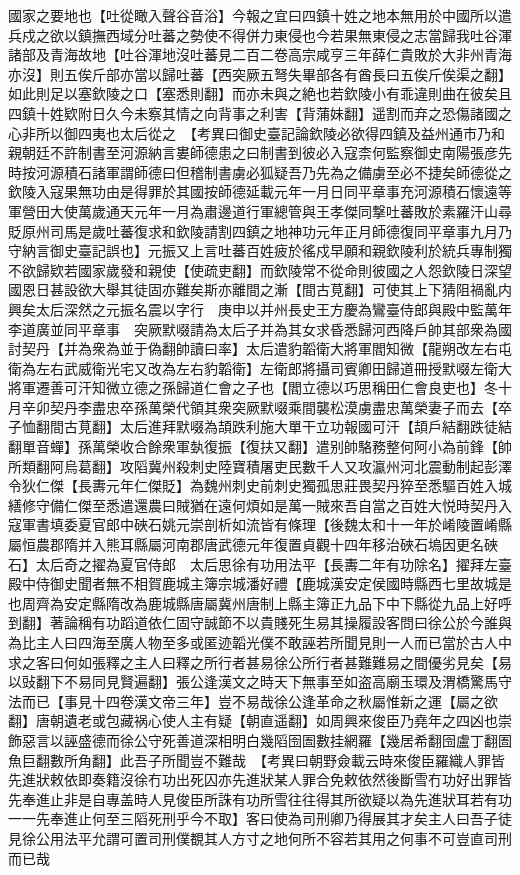 國家之要地也【吐從瞰入聲谷音浴】今報之宜曰四鎮十姓之地本無用於中國所以遣兵戍之欲以鎮撫西域分吐蕃之勢使不得併力東侵也今若果無東侵之志當歸我吐谷渾諸部及青海故地【吐谷渾地沒吐蕃見二百二卷高宗咸亨三年薛仁貴敗於大非州青海亦沒】則五俟斤部亦當以歸吐蕃【西突厥五弩失畢部各有酋長曰五俟斤俟渠之翻】如此則足以塞欽陵之口【塞悉則翻】而亦未與之絶也若欽陵小有乖違則曲在彼矣且四鎮十姓欵附日久今未察其情之向背事之利害【背蒲妹翻】遥割而弃之恐傷諸國之心非所以御四夷也太后從之　【考異曰御史臺記論欽陵必欲得四鎮及益州通市乃和親朝廷不許制書至河源納言婁師德患之曰制書到彼必入寇柰何監察御史南陽張彦先時按河源積石諸軍謂師德曰但稽制書虜必狐疑吾乃先為之備虜至必不捷矣師德從之欽陵入寇果無功由是得罪於其國按師德延載元年一月日同平章事充河源積石懷遠等軍營田大使萬歲通天元年一月為肅邊道行軍總管與王孝傑同撃吐蕃敗於素羅汗山尋貶原州司馬是歲吐蕃復求和欽陵請割四鎮之地神功元年正月師德復同平章事九月乃守納言御史臺記誤也】元振又上言吐蕃百姓疲於徭戍早願和親欽陵利於統兵專制獨不欲歸欵若國家歲發和親使【使疏吏翻】而欽陵常不從命則彼國之人怨欽陵日深望國恩日甚設欲大舉其徒固亦難矣斯亦離間之漸【間古莧翻】可使其上下猜阻禍亂内興矣太后深然之元振名震以字行　庚申以并州長史王方慶為鸞臺侍郎與殿中監萬年李道廣並同平章事　突厥默啜請為太后子并為其女求昏悉歸河西降戶帥其部衆為國討契丹【并為衆為並于偽翻帥讀曰率】太后遣豹韜衛大將軍閻知微【龍朔改左右屯衛為左右武威衛光宅又改為左右豹韜衛】左衛郎將攝司賓卿田歸道冊授默啜左衛大將軍遷善可汗知微立德之孫歸道仁會之子也【閻立德以巧思稱田仁會良吏也】冬十月辛卯契丹李盡忠卒孫萬榮代領其衆突厥默啜乘間襲松漠虜盡忠萬榮妻子而去【卒子恤翻間古莧翻】太后進拜默啜為頡跌利施大單干立功報國可汗【頡戶結翻跌徒結翻單音蟬】孫萬榮收合餘衆軍埶復振【復扶又翻】遣别帥駱務整何阿小為前鋒【帥所類翻阿烏葛翻】攻䧟冀州殺刺史陸寶積屠吏民數千人又攻瀛州河北震動制起彭澤令狄仁傑【長夀元年仁傑貶】為魏州刺史前刺史獨孤思莊畏契丹猝至悉驅百姓入城繕修守備仁傑至悉遣還農曰賊猶在遠何煩如是萬一賊來吾自當之百姓大悦時契丹入寇軍書填委夏官郎中硤石姚元崇剖析如流皆有條理【後魏太和十一年於崤陵置崤縣屬恒農郡隋并入熊耳縣屬河南郡唐武德元年復置貞觀十四年移治硤石塢因更名硤石】太后奇之擢為夏官侍郎　太后思徐有功用法平【長夀二年有功除名】擢拜左臺殿中侍御史聞者無不相賀鹿城主簿宗城潘好禮【鹿城漢安定侯國時縣西七里故城是也周齊為安定縣隋改為鹿城縣唐屬冀州唐制上縣主簿正九品下中下縣從九品上好呼到翻】著論稱有功蹈道依仁固守誠節不以貴賤死生易其操履設客問曰徐公於今誰與為比主人曰四海至廣人物至多或匿迹韜光僕不敢誣若所聞見則一人而已當於古人中求之客曰何如張釋之主人曰釋之所行者甚易徐公所行者甚難難易之間優劣見矣【易以䜴翻下不易同見賢遍翻】張公逢漢文之時天下無事至如盗高廟玉環及渭橋驚馬守法而已【事見十四卷漢文帝三年】豈不易哉徐公逢革命之秋屬惟新之運【屬之欲翻】唐朝遺老或包藏祸心使人主有疑【朝直遥翻】如周興來俊臣乃堯年之四凶也崇飾惡言以誣盛德而徐公守死善道深相明白幾䧟囹圄數挂網羅【幾居希翻囹盧丁翻圄魚巨翻數所角翻】此吾子所聞豈不難哉　【考異曰朝野僉載云時來俊臣羅織人罪皆先進狀敕依即奏籍沒徐冇功出死囚亦先進狀某人罪合免敕依然後斷雪冇功好出罪皆先奉進止非是自專盖時人見俊臣所誅有功所雪往往得其所欲疑以為先進狀耳若有功一一先奉進止何至三䧟死刑乎今不取】客曰使為司刑卿乃得展其才矣主人曰吾子徒見徐公用法平允謂可置司刑僕覩其人方寸之地何所不容若其用之何事不可豈直司刑而已哉

